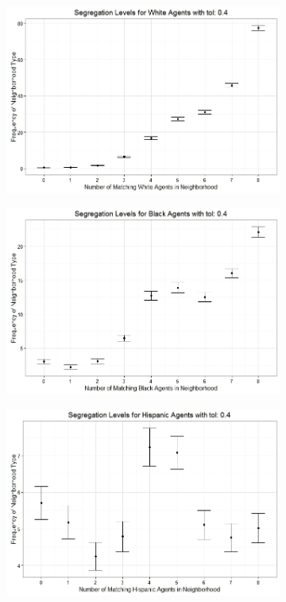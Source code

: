 \begin{figure}[h!]
\centering
\begin{subfigure}{.5\textwidth}
  \centering
\includegraphics[scale=.35]{figures/2000_4_White.jpeg}
\end{subfigure}%
\begin{subfigure}{.5\textwidth}
  \centering
\includegraphics[scale=.35]{figures/2000_4_Black.jpeg}
\end{subfigure}
\hfill \break \hfill \break
\begin{subfigure}{.5\textwidth}
  \centering
\includegraphics[scale=.35]{figures/2000_4_Hispanic.jpeg}

\end{subfigure}
\end{figure}
